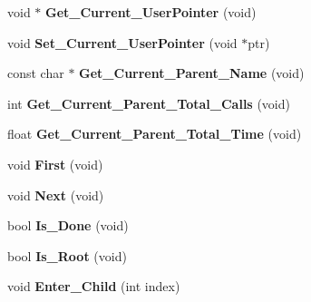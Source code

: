 \begin{DoxyCompactItemize}
\item 
\mbox{\label{classCProfileIterator_a2dd1ce5575126c0603a8da5f729f7cde}} 
void $\ast$ {\bfseries Get\+\_\+\+Current\+\_\+\+User\+Pointer} (void)
\item 
\mbox{\label{classCProfileIterator_a6873a85aab7876fd40a0789eec11b59a}} 
void {\bfseries Set\+\_\+\+Current\+\_\+\+User\+Pointer} (void $\ast$ptr)
\item 
\mbox{\label{classCProfileIterator_a8f39045cfbb406ed1b9cf1f57aac460b}} 
const char $\ast$ {\bfseries Get\+\_\+\+Current\+\_\+\+Parent\+\_\+\+Name} (void)
\item 
\mbox{\label{classCProfileIterator_a0d76e29528c64ef95de5e4fafd6cd711}} 
int {\bfseries Get\+\_\+\+Current\+\_\+\+Parent\+\_\+\+Total\+\_\+\+Calls} (void)
\item 
\mbox{\label{classCProfileIterator_a8c4aadfa90b81cf3161961f4e82dd2cc}} 
float {\bfseries Get\+\_\+\+Current\+\_\+\+Parent\+\_\+\+Total\+\_\+\+Time} (void)
\item 
\mbox{\label{classCProfileIterator_aab596c4c39b463b9a2dbd10279bb594e}} 
void {\bfseries First} (void)
\item 
\mbox{\label{classCProfileIterator_a7f003e1cf58d0225cb77514178515454}} 
void {\bfseries Next} (void)
\item 
\mbox{\label{classCProfileIterator_a77994576590dc1382148e637319b3003}} 
bool {\bfseries Is\+\_\+\+Done} (void)
\item 
\mbox{\label{classCProfileIterator_aa339a7aa093e49945ce8f9382d44d22e}} 
bool {\bfseries Is\+\_\+\+Root} (void)
\item 
\mbox{\label{classCProfileIterator_a0c5f6566bcb6cc8faf8372bda6c79f16}} 
void {\bfseries Enter\+\_\+\+Child} (int index)
\item 
\mbox{\label{classCProfileIterator_a7d2788c7bf3ac72beb078a728fe6dd65}} 

\end{DoxyCompactItemize}

